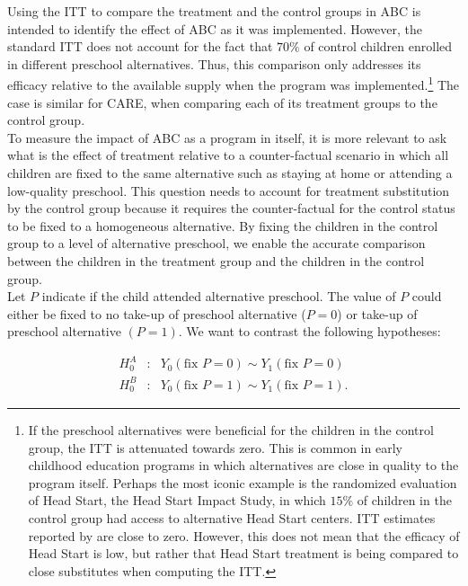 \noindent Using the ITT to compare the treatment and the control groups in ABC is intended to identify the effect of ABC as it was implemented. However, the standard ITT does not account for the fact that $70 \%$ of control children enrolled in different preschool alternatives. Thus, this comparison only addresses its efficacy relative to the available supply when the program was implemented.\footnote{If the preschool alternatives were beneficial for the children in the control group, the ITT is attenuated towards zero. This is common in early childhood education programs in which alternatives are close in quality to the program itself. Perhaps the most iconic example is the randomized evaluation of Head Start, the Head Start Impact Study, in which $15\%$ of children in the control group had access to alternative Head Start centers. ITT estimates reported by \cite{Puma_Bell_etal_2010_HeadStartImpact} are close to zero. However, this does not mean that the efficacy of Head Start is low, but rather that Head Start treatment is being compared to close substitutes when computing the ITT.} The case is similar for CARE, when comparing each of its treatment groups to the control group.\\

\noindent To measure the impact of ABC as a program in itself, it is more relevant to ask what is the effect of treatment relative to a counter-factual scenario in which all children are fixed to the same alternative such as staying at home or attending a low-quality preschool. This question needs to account for treatment substitution by the control group because it requires the counter-factual for the control status to be fixed to a homogeneous alternative. By fixing the children in the control group to a level of alternative preschool, we enable the accurate comparison between the children in the treatment group and the children in the control group.\\

\noindent Let $P$ indicate if the child attended alternative preschool. The value of $P$ could either be fixed to no take-up of preschool alternative ($P = 0$) or take-up of preschool alternative $(P = 1)$. We want to contrast the following hypotheses: 

\begin{eqnarray}
H_{0}^A &:& Y_{0} \left( \text{fix } P = 0 \right) \sim Y_{1} \left( \text{fix } P = 0 \right) \\
H_{0}^B &:& Y_{0} \left( \text{fix } P = 1 \right) \sim Y_{1} \left( \text{fix } P = 1\right). 
\end{eqnarray}

